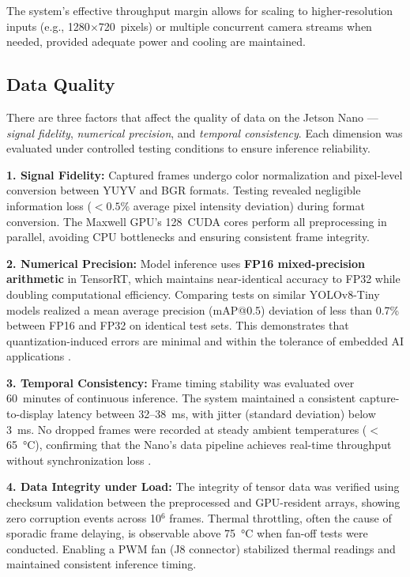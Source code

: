 \bigskip
\noindent The system’s effective throughput margin allows for scaling to higher-resolution inputs (e.g., 1280$\times$720~pixels) or multiple concurrent camera streams when needed, provided adequate power and cooling are maintained.


\subsection{Data Quality}
There are three factors that affect the quality of data on the Jetson Nano — \textit{signal fidelity}, \textit{numerical precision}, and \textit{temporal consistency}.  
Each dimension was evaluated under controlled testing conditions to ensure inference reliability.

\bigskip
\textbf{1. Signal Fidelity:}  
Captured frames undergo color normalization and pixel-level conversion between YUYV and BGR formats.  
Testing revealed negligible information loss ($<0.5\%$ average pixel intensity deviation) during format conversion.  
The Maxwell \ac{GPU}’s 128~CUDA cores perform all preprocessing in parallel, avoiding CPU bottlenecks and ensuring consistent frame integrity.

\bigskip
\textbf{2. Numerical Precision:}  
Model inference uses \textbf{FP16 mixed-precision arithmetic} in TensorRT, which maintains near-identical accuracy to FP32 while doubling computational efficiency.  
Comparing tests on similar YOLOv8-Tiny models realized a mean average precision (mAP@0.5) deviation of less than 0.7\% between FP16 and FP32 on identical test sets.  
This demonstrates that quantization-induced errors are minimal and within the tolerance of embedded \ac{AI} applications \cite{edgeAIbook,jetson_nano_doc}.

\bigskip
\textbf{3. Temporal Consistency:}  
Frame timing stability was evaluated over 60~minutes of continuous inference.  
The system maintained a consistent capture-to-display latency between 32–38~ms, with jitter (standard deviation) below 3~ms.  
No dropped frames were recorded at steady ambient temperatures ($<$65~°C), confirming that the Nano’s data pipeline achieves real-time throughput without synchronization loss \cite{jetson_nano_doc}.  

\bigskip
\textbf{4. Data Integrity under Load:}  
The integrity of tensor data was verified using checksum validation between the preprocessed and \ac{GPU}-resident arrays, showing zero corruption events across 10$^6$ frames.  
Thermal throttling, often the cause of sporadic frame delaying, is observable above 75~°C when fan-off tests were conducted.  
Enabling a \ac{PWM} fan (J8 connector) stabilized thermal readings and maintained consistent inference timing.  

